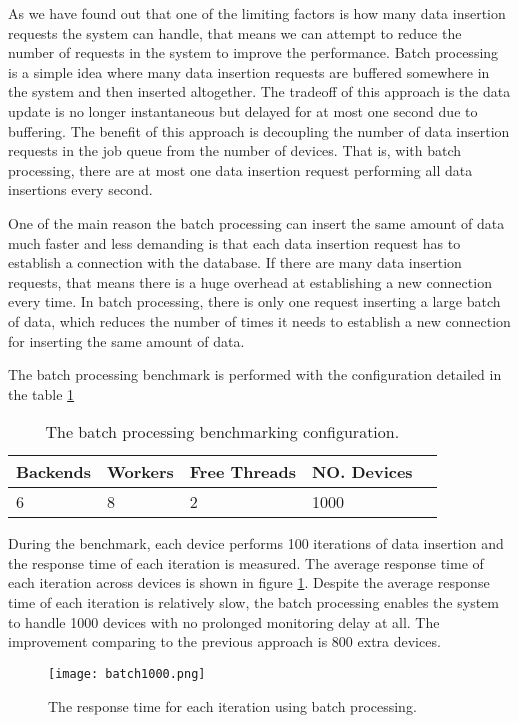 \documentclass[../thesis.tex]{subfiles}
\begin{document}
As we have found out that one of the limiting factors is how many data insertion requests the system can handle, that means we can attempt to reduce the number of requests in the system to improve the performance. Batch processing is a simple idea where many data insertion requests are buffered somewhere in the system and then inserted altogether. The tradeoff of this approach is the data update is no longer instantaneous but delayed for at most one second due to buffering. The benefit of this approach is decoupling the number of data insertion requests in the job queue from the number of devices. That is, with batch processing, there are at most one data insertion request performing all data insertions every second.

One of the main reason the batch processing can insert the same amount of data much faster and less demanding is that each data insertion request has to establish a connection with the database. If there are many data insertion requests, that means there is a huge overhead at establishing a new connection every time. In batch processing, there is only one request inserting a large batch of data, which reduces the number of times it needs to establish a new connection for inserting the same amount of data.

The batch processing benchmark is performed with the configuration detailed in the table \ref{tab:batch}

\begin{table}[h!]
\begin{center}
\caption{The batch processing benchmarking configuration.}
\label{tab:batch}
\begin{tabular}{l|l|l|l|l}
\toprule
\textbf{Backends} & \textbf{Workers} & \textbf{Free Threads} & \textbf{NO. Devices}\\
\midrule
6 & 8 & 2 & 1000\\
\bottomrule
\end{tabular}
\end{center}
\end{table}

During the benchmark, each device performs 100 iterations of data insertion and the response time of each iteration is measured. The average response time of each iteration across devices is shown in figure \ref{fig:batch}. Despite the average response time of each iteration is relatively slow, the batch processing enables the system to handle 1000 devices with no prolonged monitoring delay at all. The improvement comparing to the previous approach is 800 extra devices.

\begin{figure}[!ht]
\centering
\texttt{[image: batch1000.png]}
\caption{The response time for each iteration using batch processing.}
\label{fig:batch}
\end{figure}
\end{document}
